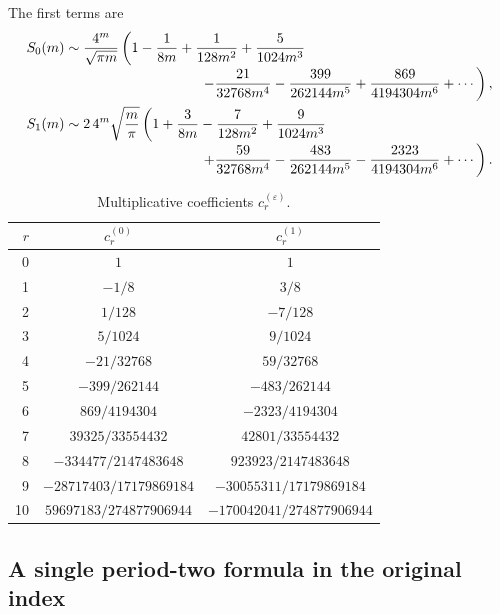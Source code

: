 \documentclass[11pt,a4paper]{article}
\theoremstyle{clean}
\theoremstyle{definition}
\newcommand{\eps}{\varepsilon}
\begin{document}
The first terms are
\begin{align}
 S_0(m)&\sim \frac{4^m}{\sqrt{\pi m}}
 \left(1-\frac1{8m}+\frac1{128m^2}+\frac5{1024m^3}\right.
 \nonumber\\[-0.25em]
 &\hspace{34mm}\left.
 -\frac{21}{32768m^4}-\frac{399}{262144m^5}
 +\frac{869}{4194304m^6}+\cdots\right),
 \label{eq:even-direct-first}\\
 S_1(m)&\sim 2\,4^m\sqrt{\frac{m}{\pi}}
 \left(1+\frac3{8m}-\frac7{128m^2}+\frac9{1024m^3}\right.
 \nonumber\\[-0.25em]
 &\hspace{34mm}\left.
 +\frac{59}{32768m^4}-\frac{483}{262144m^5}
 -\frac{2323}{4194304m^6}+\cdots\right).
 \label{eq:odd-direct-first}
\end{align}

\begin{table}[htbp]
\centering
\caption{Multiplicative coefficients \(c_r^{(\eps)}\).}
\label{tab:c}
\small
\begin{tabular}{@{}rcc@{}}
\toprule
\(r\) & \(c_r^{(0)}\) & \(c_r^{(1)}\)\\
\midrule
0 & \(1\) & \(1\)\\
1 & \(-1/8\) & \(3/8\)\\
2 & \(1/128\) & \(-7/128\)\\
3 & \(5/1024\) & \(9/1024\)\\
4 & \(-21/32768\) & \(59/32768\)\\
5 & \(-399/262144\) & \(-483/262144\)\\
6 & \(869/4194304\) & \(-2323/4194304\)\\
7 & \(39325/33554432\) & \(42801/33554432\)\\
8 & \(-334477/2147483648\) & \(923923/2147483648\)\\
9 & \(-28717403/17179869184\) & \(-30055311/17179869184\)\\
10 & \(59697183/274877906944\) & \(-170042041/274877906944\)\\
\bottomrule
\end{tabular}
\end{table}

\subsection{A single period-two formula in the original index}
\end{document}
